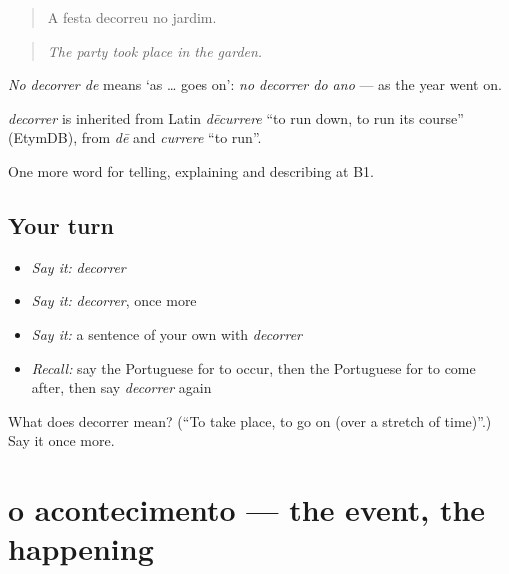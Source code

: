 \begin{quote}
A festa decorreu no jardim.
\end{quote}

\begin{quote}
\emph{The party took place in the garden.}
\end{quote}

\emph{No decorrer de} means ‘as … goes on’: \emph{no decorrer do ano} — as the year went on.

\begin{cousinweb}
\emph{decorrer} is inherited from Latin \emph{dēcurrere} \textquotedblleft{}to run down, to run its course\textquotedblright{} (EtymDB), from \emph{dē} and \emph{currere} \textquotedblleft{}to run\textquotedblright{}.
\end{cousinweb}

\begin{grammarlens}[title={What you've built}]
One more word for telling, explaining and describing at B1.
\end{grammarlens}

\subsection*{Your turn}
\begin{itemize}
\raggedright
  \item \emph{Say it:} \emph{decorrer}
  \item \emph{Say it:} \emph{decorrer}, once more
  \item \emph{Say it:} a sentence of your own with \emph{decorrer}
  \item \emph{Recall:} say the Portuguese for to occur, then the Portuguese for to come after, then say \emph{decorrer} again
\end{itemize}

\begin{tcolorbox}[breakable,colback=teal!4,colframe=teal!35!black,title={Before you move on}]
What does decorrer mean? (\textquotedblleft{}To take place, to go on (over a stretch of time)\textquotedblright{}.) Say it once more.
\end{tcolorbox}
\section[o acontecimento]{o acontecimento — the event, the happening}

\label{lesson:PT-C271-acontecimento}



